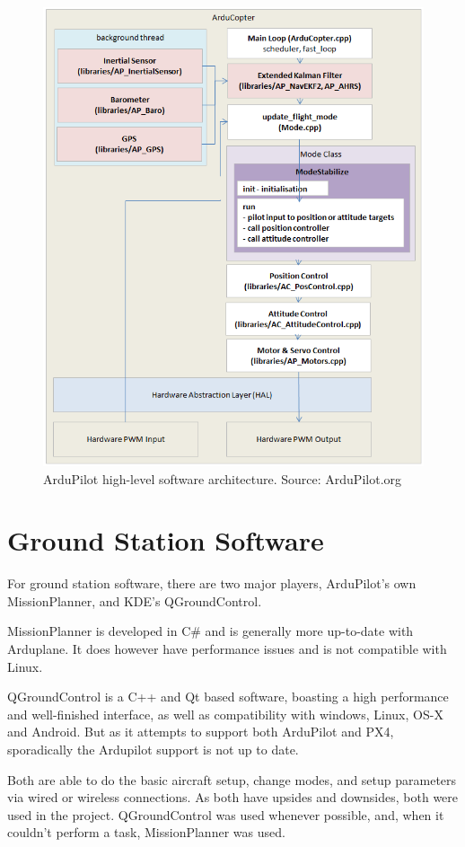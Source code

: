 \begin{figure}[h]
\centering
  \includegraphics[width=0.8\linewidth]{figs/copter-architecture.png}
  \caption{ArduPilot high-level software architecture. Source: ArduPilot.org}
  \label{fig:lowlevel}
\end{figure}


\section{Ground Station Software}

For ground station software, there are two major players, ArduPilot's own MissionPlanner, and KDE's QGroundControl.

MissionPlanner is developed in C\# and is generally more up-to-date with Arduplane.
%
It does however have performance issues and is not compatible with Linux.
%

QGroundControl is a C++ and Qt based software, boasting a high performance and well-finished interface, as well as compatibility with windows, Linux, OS-X and Android. But as it attempts to support both ArduPilot and PX4, sporadically the Ardupilot support is not up to date.
%

Both are able to do the basic aircraft setup, change modes, and setup parameters via wired or wireless connections. As both have upsides and downsides, both were used in the project. QGroundControl was used whenever possible, and, when it couldn’t perform a task, MissionPlanner was used.

